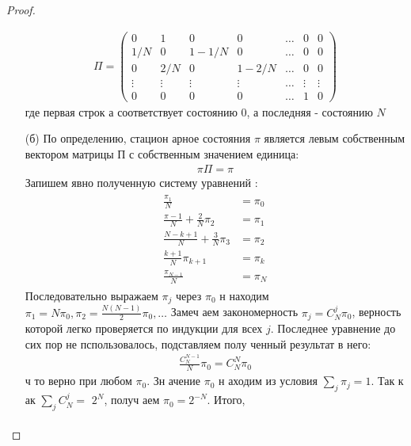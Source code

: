 \begin{proof}
\begin{itemize}
        \begin{gather*}
        \Pi=
        \begin{pmatrix}
            0 & 1 & 0 & 0 & \ldots & 0 & 0 \\
            1 / N & 0 & 1-1 / N & 0 & \ldots & 0 & 0 \\
            0 & 2 / N & 0 & 1-2 / N & \ldots & 0 & 0 \\
            \vdots & \vdots & \vdots & \vdots & \ldots & \vdots & \vdots \\
            0 & 0 & 0 & 0 & \ldots & 1 & 0
        \end{pmatrix}
        \end{gather*}
        где первая строк а соответствует состоянию 0, а последняя - состоянию $N$
    \item[(б)]
        По определению, стацион арное состояния $\pi$ является левым собственным вектором матрицы П с собственным значением единица:
        \begin{gather*}
            \pi \Pi=\pi
        \end{gather*}
        Запишем явно полученную систему уравнений :
        \begin{gather*}
        \begin{aligned}
            \frac{\pi_{1}}{N} &=\pi_{0} \\
            \frac{\pi-1}{N}+\frac{2}{N} \pi_{2} &=\pi_{1} \\
            \frac{N-k+1}{N}+\frac{3}{N} \pi_{3} &=\pi_{2} \\
            \frac{k+1}{N} \pi_{k+1} &=\pi_{k} \\
            \frac{\pi_{N-1}}{N} &=\pi_{N}
        \end{aligned}
        \end{gather*}
        Последовательно выражаем $\pi_{j}$ через $\pi_{0}$ н находим $\pi_{1}=N \pi_{0}, \pi_{2}=\frac{N(N-1)}{2} \pi_{0}, \ldots$ Замеч аем закономерность $\pi_{j}=C_{N}^{j} \pi_{0}$, верность которой легко проверяется по индукции для всех $j$. Последнее уравнение до сих пор не пспользовалось, подставляем полу ченный результат в него:
        \begin{gather*}
            \frac{C_{N}^{N-1}}{N} \pi_{0}=C_{N}^{N} \pi_{0}
        \end{gather*}
        ч то верно при любом $\pi_{0}$. Зн ачение $\pi_{0}$ н аходим из условия $\sum_{j} \pi_{j}=1 .$ Так к ак $\sum_{j} C_{N}^{j}=$ $2^{N}$, получ аем $\pi_{0}=2^{-N}$. Итого,
        \begin{gather*}

\end{gather*}
\end{itemize}
\end{proof}
